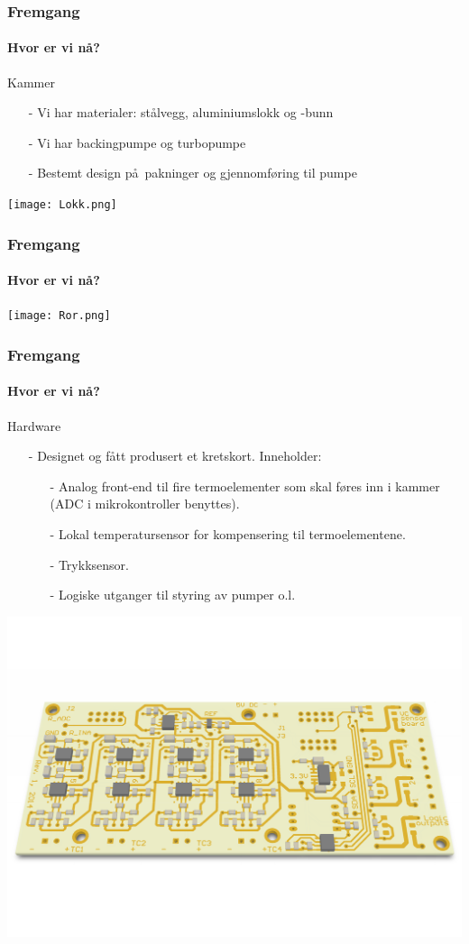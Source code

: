 \documentclass{beamer}
\begin{document}
  \begin{frame}
    \frametitle{Fremgang}
    \framesubtitle{Hvor er vi n\aa ?}
    \begin{block}{Kammer}
    	\begin{itemize}
    		\item[-] Vi har materialer: st\aa lvegg, aluminiumslokk og -bunn
    		\item[-] Vi har backingpumpe og turbopumpe
    		\item[-] Bestemt design p\aa\ pakninger og gjennomf\o ring til pumpe
    	\end{itemize}
    \end{block}
    	\begin{center}
    		\texttt{[image: Lokk.png]}
    	\end{center}
    \end{frame}
    
    \begin{frame}
    	\frametitle{Fremgang}
    	\framesubtitle{Hvor er vi n\aa ?}
    		\begin{center}
    			\texttt{[image: Ror.png]}
    		\end{center}
    \end{frame}
    		
    \begin{frame}
    	\frametitle{Fremgang}
    	\framesubtitle{Hvor er vi n\aa ?}
    	\begin{block}{Hardware}
    		\begin{itemize}
    			\item[-] Designet og fått produsert et kretskort. Inneholder:
					\begin{itemize}
					\item[-] Analog front-end til fire termoelementer som skal føres inn i kammer (ADC i mikrokontroller benyttes).
					\item[-] Lokal temperatursensor for kompensering til termoelementene.
					\item[-] Trykksensor.
					\item[-] Logiske utganger til styring av pumper o.l.
					\end{itemize}
    		\end{itemize}
    	\end{block}
			\includegraphics[width=\textwidth]{kretskort.pdf}
    \end{frame}
    
\end{document}
